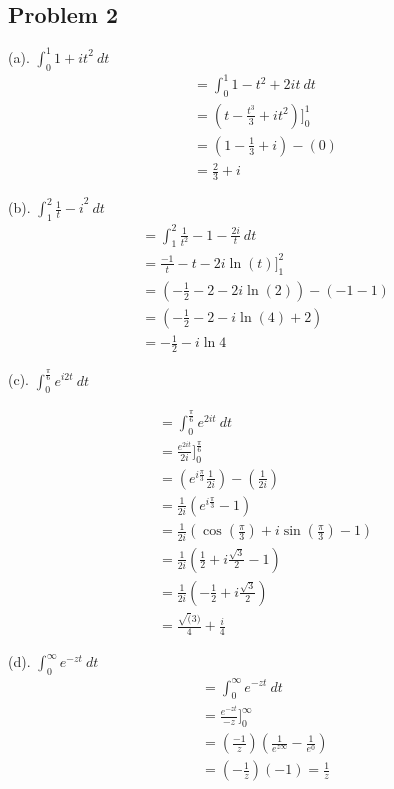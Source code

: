 \documentclass[a4paper]{report}
\begin{document}
            

\subsection*{Problem 2}
(a). $\int_{{0}}^{{1}} {1+it}^2 \: dt $
\begin{align*}
&=\int_{{0}}^{{1}} {1 - t^2 + 2it} \: d{t} {}\\
&=(t - \frac{t^{3}}{3}+it^2)]_0^1\\
&=(1 - \frac{1}{3} + i) - (0)\\
&=\frac{2}{3}+ i
\end{align*}

(b). $\int_{{1}}^{{2}} {\frac{1}{t}-i}^2 \: d{t} {}$
\begin{align*}
    &=\int_{{1}}^{{2}} {\frac{1}{t^2} - 1 - \frac{2i}{t}} \: d{t} {}\\
    &=\frac{-1}{t} - t - 2i \ln(t)]_1^2\\
    &=(-\frac{1}{2} - 2 - 2i\ln(2)) - (-1 -1)\\
    &=(-\frac{1}{2}-2-i\ln(4) + 2)\\
    &=-\frac{1}{2}-i\ln4
\end{align*}

(c). $\int_{{0}}^{{\frac{\pi}{6}}} {e^{i2t}} \: d{t}$


\begin{align*}
    &=\int_{{0}}^{{\frac{\pi}{6}}} {e^{2it}} \: d{t} {}\\
    &=\frac{e^{2it}}{2i}]_0^{\frac{\pi}{6}}\\
    &=(e^{i\frac{\pi}{3}} \frac{1}{2i}) - (\frac{1}{2i})\\
    &=\frac{1}{2i} (e^{i\frac{\pi}{3}} - 1)\\
    &=\frac{1}{2i}(\cos(\frac{\pi}{3}) + i\sin(\frac{\pi}{3}) - 1)\\
    &=\frac{1}{2i}(\frac{1}{2} + i\frac{\sqrt{3}}{2} - 1)\\
    &=\frac{1}{2i}(-\frac{1}{2} + i\frac{\sqrt{3}}{2})\\
    &=\frac{\sqrt(3)}{4} + \frac{i}{4}
\end{align*}

(d). $\int_{{0}}^{{\infty}} {e^{-zt}} \: d{t} {}$
\begin{align*}
    &=\int_{{0}}^{{\infty}} {e^{-zt}} \: d{t} {}\\
    &=\frac{e^{-zt}}{-z}]_0^{\infty}\\
    &=(\frac{-1}{z}) (\frac{1}{e^{z\infty}} - \frac{1}{e^{0}})\\
    &=(-\frac{1}{z})(-1)=\frac{1}{z}
\end{align*}
\end{document}
